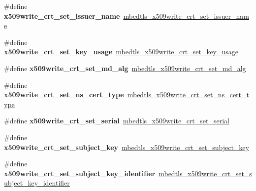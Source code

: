 \begin{DoxyCompactItemize}
\#define {\bfseries x509write\+\_\+crt\+\_\+set\+\_\+issuer\+\_\+name}~\mbox{\hyperlink{x509__crt_8h_a5378017315ad6ac4da70f07777259e19}{mbedtls\+\_\+x509write\+\_\+crt\+\_\+set\+\_\+issuer\+\_\+name}}
\item 
\mbox{\label{compat-1_83_8h_a7ddb9e907d38eb1e91c207399ede8e18}} 
\#define {\bfseries x509write\+\_\+crt\+\_\+set\+\_\+key\+\_\+usage}~\mbox{\hyperlink{x509__crt_8h_a5ce0db5d77fe07074601c585fe63089a}{mbedtls\+\_\+x509write\+\_\+crt\+\_\+set\+\_\+key\+\_\+usage}}
\item 
\mbox{\label{compat-1_83_8h_a78da3cf3f1ed0944988eae988204df98}} 
\#define {\bfseries x509write\+\_\+crt\+\_\+set\+\_\+md\+\_\+alg}~\mbox{\hyperlink{x509__crt_8h_abdb1cdce6c47b3e697258279bb0e8715}{mbedtls\+\_\+x509write\+\_\+crt\+\_\+set\+\_\+md\+\_\+alg}}
\item 
\mbox{\label{compat-1_83_8h_ab60e85b54c474b70f0bc08001d73d4e4}} 
\#define {\bfseries x509write\+\_\+crt\+\_\+set\+\_\+ns\+\_\+cert\+\_\+type}~\mbox{\hyperlink{x509__crt_8h_a62f8e6d643c142c87662655bcfc7c7a5}{mbedtls\+\_\+x509write\+\_\+crt\+\_\+set\+\_\+ns\+\_\+cert\+\_\+type}}
\item 
\mbox{\label{compat-1_83_8h_ac5fd20973d471bcd2965925d44a39e01}} 
\#define {\bfseries x509write\+\_\+crt\+\_\+set\+\_\+serial}~\mbox{\hyperlink{x509__crt_8h_a32c8ac687c84d8066213297e6813c2f0}{mbedtls\+\_\+x509write\+\_\+crt\+\_\+set\+\_\+serial}}
\item 
\mbox{\label{compat-1_83_8h_a4a6fe20747a63fd7ba5467e89565f207}} 
\#define {\bfseries x509write\+\_\+crt\+\_\+set\+\_\+subject\+\_\+key}~\mbox{\hyperlink{x509__crt_8h_a110c19b1d4379efa650a7e431276f9b0}{mbedtls\+\_\+x509write\+\_\+crt\+\_\+set\+\_\+subject\+\_\+key}}
\item 
\mbox{\label{compat-1_83_8h_a6577eea2f76652079038594ebaed9588}} 
\#define {\bfseries x509write\+\_\+crt\+\_\+set\+\_\+subject\+\_\+key\+\_\+identifier}~\mbox{\hyperlink{x509__crt_8h_a09dd1d818f15b9655f5dbcd3d7c1ec0f}{mbedtls\+\_\+x509write\+\_\+crt\+\_\+set\+\_\+subject\+\_\+key\+\_\+identifier}}
\item 
\mbox{\label{compat-1_83_8h_afcc9372e84bd8436123f67518e2af6fe}} 

\end{DoxyCompactItemize}
